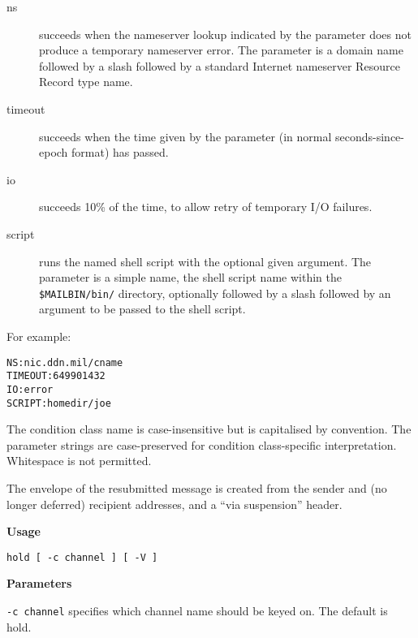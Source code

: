 \begin{description}
\item[ns] \mbox{}

succeeds when the nameserver lookup indicated by
the parameter does not produce a temporary nameserver 
error. The parameter is a domain name followed by a slash 
followed by a standard Internet
nameserver Resource Record type name.



\item[timeout] \mbox{}

succeeds when the time given by the parameter (in
normal seconds-since-epoch format) has passed.



\item[io] \mbox{}

succeeds 10\% of the time, to allow retry of temporary I/O failures.



\item[script] \mbox{}

runs the named shell script with the optional given
argument. The parameter is a simple name, the
shell script name within the {\tt \$MAILBIN/bin/} directory,
optionally followed by a slash followed by an argument to be 
passed to the shell script.

\end{description}


For example:

\begin{verbatim}
NS:nic.ddn.mil/cname
TIMEOUT:649901432
IO:error
SCRIPT:homedir/joe
\end{verbatim}


The condition class name is case-insensitive but is 
capitalised by convention. The parameter strings are 
case-preserved for condition class-specific interpretation.
Whitespace is not permitted.

The envelope of the resubmitted message is created from
the sender and (no longer deferred) recipient addresses,
and a ``via suspension'' header.

{\bf Usage}

\begin{verbatim}
hold [ -c channel ] [ -V ]
\end{verbatim}


{\bf Parameters}

{\tt -c channel} specifies which channel name should be keyed on. The default is hold.

